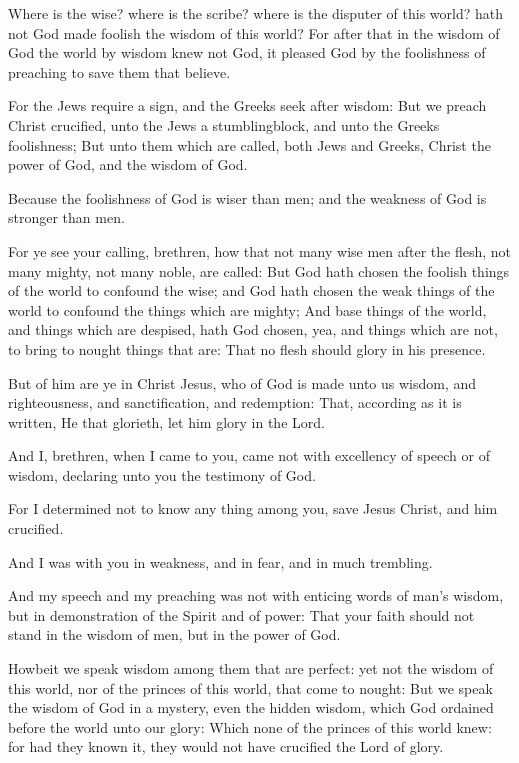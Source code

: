 \Verse Where is the wise? where is the scribe? where is the disputer of this world? hath not God made foolish the wisdom of this world?  \Verse For after that in the wisdom of God the world by wisdom knew not God, it pleased God by the foolishness of preaching to save them that believe.

\Verse For the Jews require a sign, and the Greeks seek after wisdom: \Verse But we preach Christ crucified, unto the Jews a stumblingblock, and unto the Greeks foolishness; \Verse But unto them which are called, both Jews and Greeks, Christ the power of God, and the wisdom of God.

\Verse Because the foolishness of God is wiser than men; and the weakness of God is stronger than men.

\Verse For ye see your calling, brethren, how that not many wise men after the flesh, not many mighty, not many noble, are called: \Verse But God hath chosen the foolish things of the world to confound the wise; and God hath chosen the weak things of the world to confound the things which are mighty; \Verse And base things of the world, and things which are despised, hath God chosen, yea, and things which are not, to bring to nought things that are: \Verse That no flesh should glory in his presence.

\Verse But of him are ye in Christ Jesus, who of God is made unto us wisdom, and righteousness, and sanctification, and redemption: \Verse That, according as it is written, He that glorieth, let him glory in the Lord.


\Chapter
\Verse And I, brethren, when I came to you, came not with excellency of speech or of wisdom, declaring unto you the testimony of God.

\Verse For I determined not to know any thing among you, save Jesus Christ, and him crucified.

\Verse And I was with you in weakness, and in fear, and in much trembling.

\Verse And my speech and my preaching was not with enticing words of man's wisdom, but in demonstration of the Spirit and of power: \Verse That your faith should not stand in the wisdom of men, but in the power of God.

\Verse Howbeit we speak wisdom among them that are perfect: yet not the wisdom of this world, nor of the princes of this world, that come to nought: \Verse But we speak the wisdom of God in a mystery, even the hidden wisdom, which God ordained before the world unto our glory: \Verse Which none of the princes of this world knew: for had they known it, they would not have crucified the Lord of glory.

